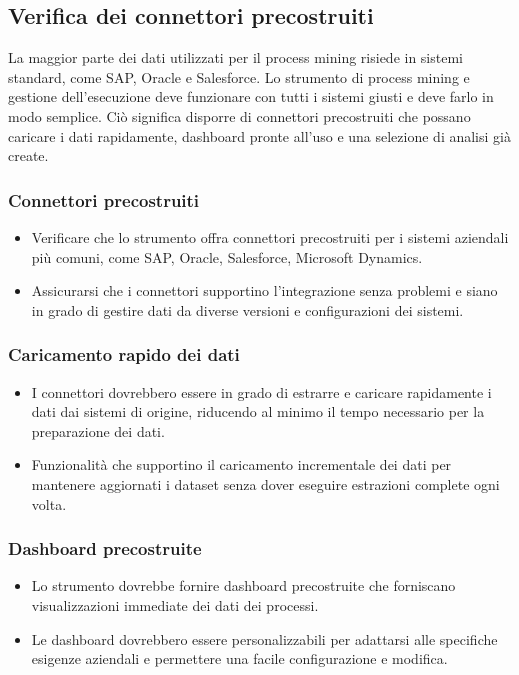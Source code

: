 \documentclass{article}
\begin{document}
\subsection{Verifica dei connettori precostruiti}
La maggior parte dei dati utilizzati per il process mining risiede in sistemi standard, come SAP, Oracle e Salesforce. Lo strumento di process mining e gestione dell'esecuzione deve funzionare con tutti i sistemi giusti e deve farlo in modo semplice. Ciò significa disporre di connettori precostruiti che possano caricare i dati rapidamente, dashboard pronte all'uso e una selezione di analisi già create.
\subsubsection{Connettori precostruiti}
\begin{itemize}
    \item Verificare che lo strumento offra connettori precostruiti per i sistemi aziendali più comuni, come SAP, Oracle, Salesforce, Microsoft Dynamics.
    \item Assicurarsi che i connettori supportino l'integrazione senza problemi e siano in grado di gestire dati da diverse versioni e configurazioni dei sistemi.
\end{itemize}
\subsubsection{Caricamento rapido dei dati}
\begin{itemize}
    \item I connettori dovrebbero essere in grado di estrarre e caricare rapidamente i dati dai sistemi di origine, riducendo al minimo il tempo necessario per la preparazione dei dati.
    \item Funzionalità che supportino il caricamento incrementale dei dati per mantenere aggiornati i dataset senza dover eseguire estrazioni complete ogni volta.
\end{itemize}
\subsubsection{Dashboard precostruite}
\begin{itemize}
    \item Lo strumento dovrebbe fornire dashboard precostruite che forniscano visualizzazioni immediate dei dati dei processi.
    \item Le dashboard dovrebbero essere personalizzabili per adattarsi alle specifiche esigenze aziendali e permettere una facile configurazione e modifica.
\end{itemize}
\end{document}

